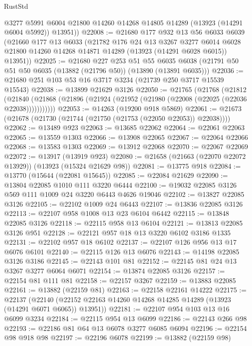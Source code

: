 \begin{lexlean}{RustStd}
\begin{coremodule}
        @3277
        @5991
        @6004
        @21800
        @14260
        @14268
        @14805
        @14289
        (@13923 (@14291 @6004 @5992))
        @13951))
@22008 := @21680
    @177
    @932
    @13
    @56
    @6033
    @6039
    (@21660
      @177
      @13
      @6033
      (@21782
        @176
        @24
        @13
        @3267
        @3277
        @6014
        @6028
        @21800
        @14260
        @14268
        @14871
        @14289
        (@13923 (@14291 @6028 @6015))
        @13951))
@22025 := @21680
    @227
    @253
    @51
    @55
    @6035
    @6038
    (@21791 @50 @51 @50 @6035 (@13882 (@21796 @50)) (@13890 (@13891 @6035)))
@22036 := @21680 @251 @103 @53 @16 @3717 @3234 (@21739 @250 @3717 @15539 @15543)
@22038 := @13899 @21629 @3126
@22050 := @21765
    (@21768
      (@21812
        (@21840 (@21868 (@21896 (@21924 (@21952 (@21980 (@22008 (@22025 (@22036 @22038)))))))))))
@22053 := @14263 (@19200 @918 @5869)
@22061 := @21673 (@21678 (@21730 (@21744 (@21750 (@21753 (@22050 @22053)) @22038))))
@22062 := @13489 @923
@22063 := @13685 @22062
@22064 := @22061 @22063
@22065 := @13559 @1303
@22066 := @13908 @22065
@22067 := @22064 @22066
@22068 := @13583 @1303
@22069 := @13912 @22068
@22070 := @22067 @22069
@22072 := @13917 (@13919 @923)
@22080 := @21658 (@21663 (@22070 @22072 @13929)) (@13923 (@15324 @21629 @98))
@22081 := @13775 @918
@22084 := @13770 (@15644 (@22081 @15645))
@22085 := @22084 @21629
@22090 := @13804 @22085 @1010 @111 @3220 @6444
@22100 := @19032 @22085 @3126 @569 @111 @1009 @24 @3220 @6443 @4626 @19046
@22102 := @13827 @22085 @3126
@22105 := @22102 @1009 @24 @6443
@22107 := @13836 @22085 @3126
@22113 := @22107 @958 @1008 @13 @23 @6104 @6442
@22115 := @13848 @22085 @3126
@22118 := @22115 @958 @13 @6104
@22121 := @13813 @22085 @3126 @951
@22128 := @22121 @957 @18 @13 @3220 @6102 @3186 @1335
@22131 := @22102 @957 @18 @6102
@22137 := @22107 @126 @956 @13 @17 @6076 @6101
@22140 := @22115 @126 @13 @6076
@22143 := @14198 @22085 @3126 @3186
@22145 := @22143 @101 @81
@22152 := @22145 @81 @24 @13 @3267 @3277 @6064 @6071
@22154 := @13874 @22085 @3126
@22157 := @22154 @81 @111 @81
@22158 := @22157 @3267
@22159 := @13883 @22085
@22161 := @13882 (@22159 @81)
@22163 := @22158 @22161 @14222
@22175 := @22137
    (@22140 (@22152 @22163 @14260 @14268 @14285 @14289 (@13923 (@14291 @6071 @6065)) @13951))
@22181 := @22107 @954 @103 @13 @16 @6099 @3234
@22184 := @22115 @954 @13 @6099
@22186 := @22143 @266 @98
@22193 := @22186 @81 @64 @13 @6078 @3277 @6085 @6094
@22196 := @22154 @98 @918 @98
@22197 := @22196 @6078
@22199 := @13882 (@22159 @98)

\end{coremodule}
\end{lexlean}
